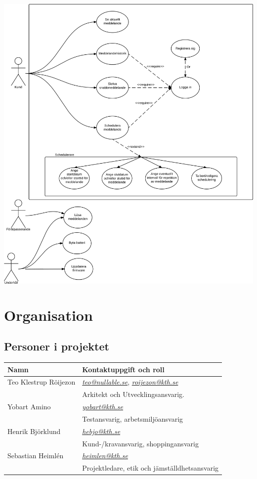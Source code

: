 \documentclass[11pt]{article}
\begin{document}
\begin{center}
\includegraphics[width=.9\linewidth]{../Arkitektur/PrimarUC.png}
\end{center}

\section{Organisation}
\label{sec:org2b64193}
\subsection{Personer i projektet}
\label{sec:org4e7946c}
\begin{center}
\begin{tabular}{ll}
\textbf{Namn} & \textbf{Kontaktuppgift och roll}\\
\hline
Teo Klestrup Röijezon & \href{mailto:teo@nullable.se}{\emph{teo@nullable.se}}, \href{mailto:roijezon@kth.se}{\emph{roijezon@kth.se}}\\
 & Arkitekt och Utvecklingsansvarig.\\
Yobart Amino & \href{mailto:yobart@kth.se}{\emph{yobart@kth.se}}\\
 & Testansvarig, arbetsmiljöansvarig\\
Henrik Björklund & \href{mailto:hebjo@kth.se}{\emph{hebjo@kth.se}}\\
 & Kund-/kravansvarig, shoppingansvarig\\
Sebastian Heimlén & \href{mailto:heimlen@kth.se}{\emph{heimlen@kth.se}}\\
 & Projektledare, etik och jämställdhetsansvarig\\
\end{tabular}
\end{center}
\end{document}
